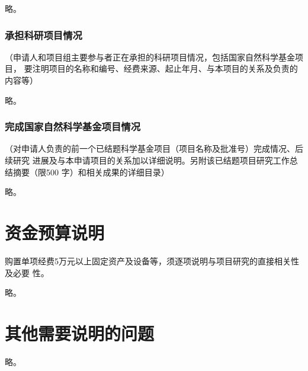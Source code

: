 \documentclass[subfig,boldtoc]{mynsfc}
\begin{document}
略。

\section{承担科研项目情况}
\label{sec:projects}

\begin{hcomment}
  （申请人和项目组主要参与者正在承担的科研项目情况，包括国家自然科学基金项目，
  要注明项目的名称和编号、经费来源、起止年月、与本项目的关系及负责的内容等）
\end{hcomment}

略。

\section{完成国家自然科学基金项目情况}
\label{sec:prev-nsfc}

\begin{hcomment}
  （对申请人负责的前一个已结题科学基金项目（项目名称及批准号）完成情况、后续研究
  进展及与本申请项目的关系加以详细说明。另附该已结题项目研究工作总结摘要（限500
  字）和相关成果的详细目录）
\end{hcomment}

略。

\part{资金预算说明}
\label{sec:finance}

\begin{hcomment}
  购置单项经费5万元以上固定资产及设备等，须逐项说明与项目研究的直接相关性及必要
  性。
\end{hcomment}

略。

\part{其他需要说明的问题}
\label{sec:others}

略。
\end{document}
